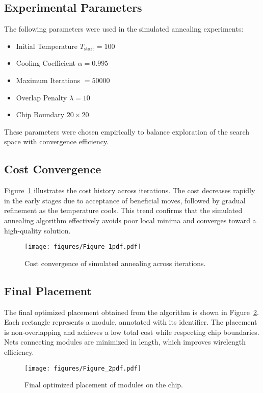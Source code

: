 \documentclass[9pt,a4paper,twoside]{rho-class/rho}
\begin{document}
\subsection{Experimental Parameters}
The following parameters were used in the simulated annealing experiments:
\begin{itemize}
    \item Initial Temperature $T_{\text{start}} = 100$
    \item Cooling Coefficient $\alpha = 0.995$
    \item Maximum Iterations $= 50000$
    \item Overlap Penalty $\lambda = 10$
    \item Chip Boundary $20 \times 20$
\end{itemize}

These parameters were chosen empirically to balance exploration of the search space with convergence efficiency.

\subsection{Cost Convergence}
Figure~\ref{fig:cost_convergence} illustrates the cost history across iterations. The cost decreases rapidly in the early stages due to acceptance of beneficial moves, followed by gradual refinement as the temperature cools. This trend confirms that the simulated annealing algorithm effectively avoids poor local minima and converges toward a high-quality solution.

\begin{figure}[h!]
    \centering
    \texttt{[image: figures/Figure\_1pdf.pdf]}
    \caption{Cost convergence of simulated annealing across iterations.}
    \label{fig:cost_convergence}
\end{figure}

\subsection{Final Placement}
The final optimized placement obtained from the algorithm is shown in Figure~\ref{fig:placement}. Each rectangle represents a module, annotated with its identifier. The placement is non-overlapping and achieves a low total cost while respecting chip boundaries. Nets connecting modules are minimized in length, which improves wirelength efficiency.

\begin{figure}[h!]
    \centering
    \texttt{[image: figures/Figure\_2pdf.pdf]}
    \caption{Final optimized placement of modules on the chip.}
    \label{fig:placement}
\end{figure}
\end{document}
